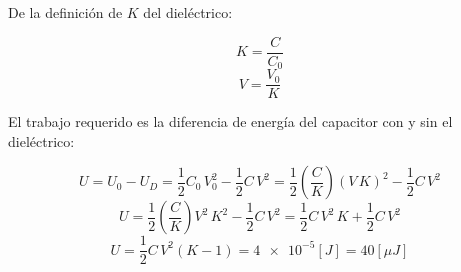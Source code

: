 \documentclass[letter,11pt]{article}
\begin{document}
\begin{enumerate}
De la definición de $K$ del dieléctrico:

\begin{equation*}
    K = \frac{C}{C_0}
\end{equation*}
\begin{equation*}
    V = \frac{V_0}{K}
\end{equation*}

El trabajo requerido es la diferencia de energía del capacitor con y sin el
dieléctrico:

\begin{equation*}
    U = U_0 - U_D
      = \frac{1}{2}C_0\,V^2_0-\frac{1}{2}C\,V^2
      = \frac{1}{2}\left(\frac{C}{K}\right)(V\,K)^2-\frac{1}{2}C\,V^2
\end{equation*}
\begin{equation*}
    U = \frac{1}{2}\left(\frac{C}{K}\right)V^2\,K^2-\frac{1}{2}C\,V^2
      = \frac{1}{2}C\,V^2\,K+\frac{1}{2}C\,V^2
\end{equation*}
\begin{equation*}
    U = \frac{1}{2}C\,V^2(K-1) = \num{4e-5} [J] = 40 [\mu J]
\end{equation*}

\end{enumerate}
\end{document}
